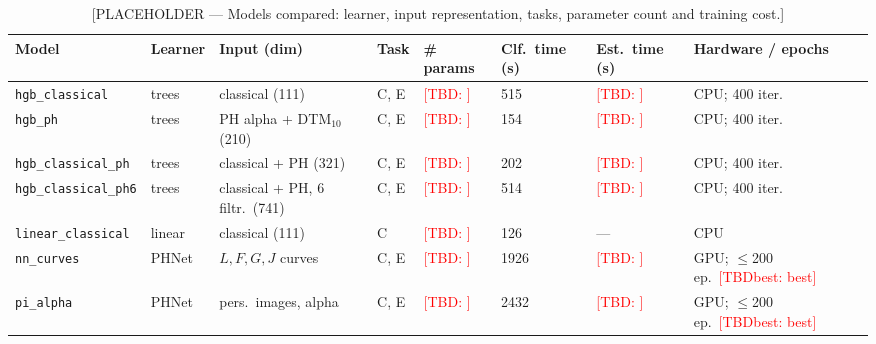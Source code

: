 \documentclass[twoside]{article}
\newcommand{\TBD}[1]{\textcolor{red}{[TBD\ifx\relax#1\relax\else: #1\fi]}}
\begin{document}
\begin{table}[t]
\caption{[PLACEHOLDER — Models compared: learner, input representation, tasks, parameter count and training cost.]}
\label{tab:models}
\begin{center}
\footnotesize
\begin{tabular}{@{}llllllll@{}}
\toprule
Model & Learner & Input (dim) & Task & \# params & Clf.\ time (s) & Est.\ time (s) & Hardware / epochs \\
\midrule
\texttt{hgb\_classical}       & trees  & classical (111)                & C, E & \TBD{} & 515  & \TBD{} & CPU; 400 iter. \\
\texttt{hgb\_ph}              & trees  & PH alpha + DTM$_{10}$ (210)    & C, E & \TBD{} & 154  & \TBD{} & CPU; 400 iter. \\
\texttt{hgb\_classical\_ph}   & trees  & classical + PH (321)           & C, E & \TBD{} & 202  & \TBD{} & CPU; 400 iter. \\
\texttt{hgb\_classical\_ph6}  & trees  & classical + PH, 6 filtr.\ (741)& C, E & \TBD{} & 514  & \TBD{} & CPU; 400 iter. \\
\texttt{linear\_classical}    & linear & classical (111)                & C    & \TBD{} & 126  & ---    & CPU \\
\texttt{nn\_curves}           & PHNet  & $L,F,G,J$ curves               & C, E & \TBD{} & 1926 & \TBD{} & GPU; $\le$200 ep.\ \TBD{best} \\
\texttt{pi\_alpha}            & PHNet  & pers.\ images, alpha           & C, E & \TBD{} & 2432 & \TBD{} & GPU; $\le$200 ep.\ \TBD{best} \\

\end{tabular}
\end{center}
\end{table}
\end{document}
